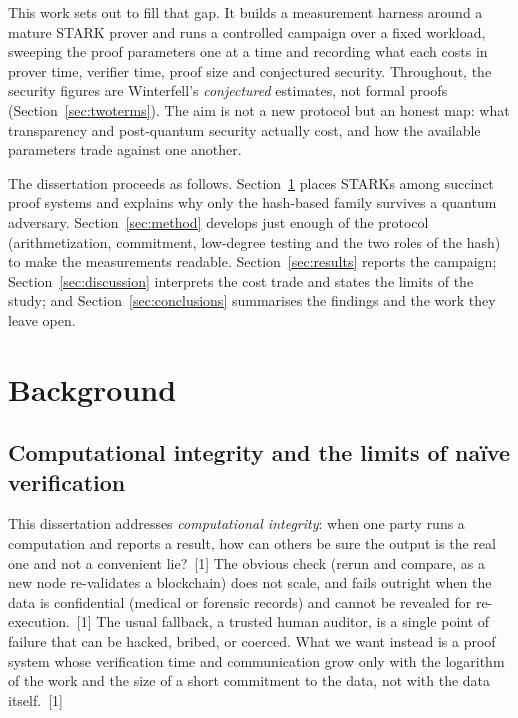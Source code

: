 \documentclass[11pt]{article}
\begin{document}
This work sets out to fill that gap. It builds a measurement harness around a mature STARK prover and
runs a controlled campaign over a fixed workload, sweeping the proof parameters one at a time and
recording what each costs in prover time, verifier time, proof size and conjectured security. Throughout,
the security figures are Winterfell's \emph{conjectured} estimates, not formal proofs
(Section~\ref{sec:twoterms}). The aim is not a new protocol but an honest map: what transparency and
post-quantum security actually cost, and how the available parameters trade against one another.

The dissertation proceeds as follows. Section~\ref{sec:background} places STARKs among succinct proof
systems and explains why only the hash-based family survives a quantum adversary. Section~\ref{sec:method}
develops just enough of the protocol (arithmetization, commitment, low-degree testing and the two
roles of the hash) to make the measurements readable. Section~\ref{sec:results} reports the campaign;
Section~\ref{sec:discussion} interprets the cost trade and states the limits of the study; and
Section~\ref{sec:conclusions} summarises the findings and the work they leave open.

\section{Background}
\label{sec:background}

\subsection{Computational integrity and the limits of na\"ive verification}

This dissertation addresses \emph{computational integrity}: when one party runs a computation and
reports a result, how can others be sure the output is the real one and not a convenient lie?~[1] The
obvious check (rerun and compare, as a new node re-validates a blockchain) does not scale, and
fails outright when the data is confidential (medical or forensic records) and cannot be revealed for
re-execution.~[1] The usual fallback, a trusted human auditor, is a single point of failure that can be
hacked, bribed, or coerced. What we want instead is a proof system whose verification time and
communication grow only with the logarithm of the work and the size of a short commitment to the data,
not with the data itself.~[1]
\end{document}
